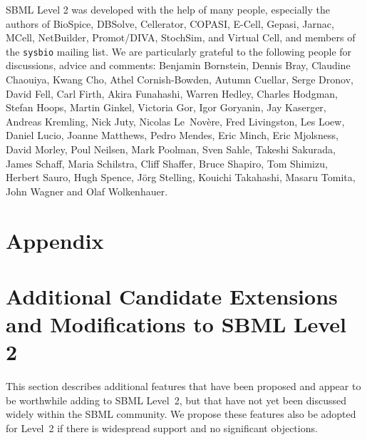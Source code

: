 \documentclass[10pt,twocolumntoc]{cekarticle}
\begin{document}
SBML Level 2 was developed with the help of many people, especially the
authors of BioSpice, DBSolve, Cellerator, COPASI, E-Cell, Gepasi, Jarnac,
MCell, NetBuilder, Promot/DIVA, StochSim, and Virtual Cell, and members of
the \texttt{sysbio} mailing list.  We are particularly grateful to the
following people for discussions, advice and comments: Benjamin Bornstein,
Dennis Bray, Claudine Chaouiya, Kwang Cho, Athel Cornish-Bowden, Autumn
Cuellar, Serge Dronov, David Fell, Carl Firth, Akira Funahashi, Warren
Hedley, Charles Hodgman, Stefan Hoops, Martin Ginkel, Victoria Gor, Igor
Goryanin, Jay Kaserger, Andreas Kremling, Nick Juty, Nicolas Le~Nov\`{e}re,
Fred Livingston, Les Loew, Daniel Lucio, Joanne Matthews, Pedro Mendes,
Eric Minch, Eric Mjolsness, David Morley, Poul Neilsen, Mark Poolman, Sven
Sahle, Takeshi Sakurada, James Schaff, Maria Schilstra, Cliff Shaffer,
Bruce Shapiro, Tom Shimizu, Herbert Sauro, Hugh Spence, J\"{o}rg Stelling,
Kouichi Takahashi, Masaru Tomita, John Wagner and Olaf Wolkenhauer.

\newpage
\section{Appendix}
\setcounter{secnumdepth}{2}
\appendix

\section{Additional Candidate Extensions and Modifications to SBML Level 2}
\label{apdx:extensions}

This section describes additional features that have been proposed and
appear to be worthwhile adding to SBML Level~2, but that have not yet been
discussed widely within the SBML community.  We propose these features also
be adopted for Level~2 if there is widespread support and no significant
objections.


\end{document}
